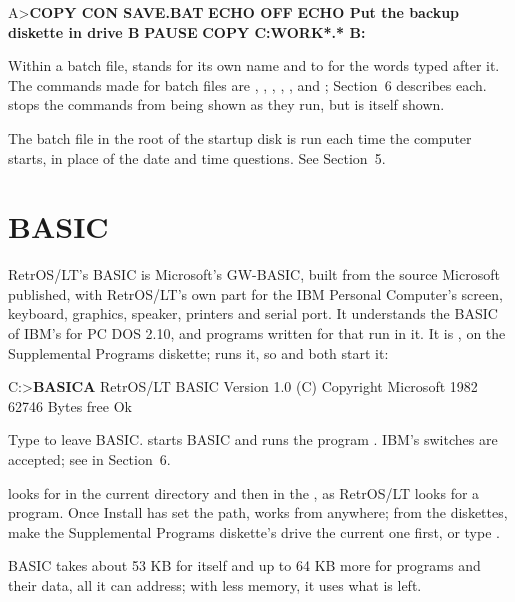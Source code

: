 \begin{dialogue}
A>\textbf{COPY CON SAVE.BAT}
\textbf{ECHO OFF}
\textbf{ECHO Put the backup diskette in drive B}
\textbf{PAUSE}
\textbf{COPY C:\bs{}WORK\bs{}*.* B:}
 
\end{dialogue}

Within a batch file,  stands for its own name and  to
 for the words typed after it. The commands made for batch
files are , , , ,
,  and ; Section~6 describes each.
 stops the commands from being shown as they run, but is
itself shown.

The batch file  in the root of the startup disk is run
each time the computer starts, in place of the date and time questions.
See Section~5.

\section{BASIC}

RetrOS/LT's BASIC is Microsoft's GW-BASIC, built from the source
Microsoft published, with RetrOS/LT's own part for the IBM Personal
Computer's screen, keyboard, graphics, speaker, printers and serial port.
It understands the BASIC of IBM's  for PC DOS 2.10, and
programs written for that run in it. It is , on the
Supplemental Programs diskette;  runs it, so
 and  both start it:

\begin{dialogue}
C:\bs>\textbf{BASICA}
RetrOS/LT BASIC Version 1.0
(C) Copyright Microsoft 1982
62746 Bytes free
Ok
\end{dialogue}

Type  to leave BASIC.  starts BASIC and
runs the program . IBM's switches are accepted; see
 in Section~6.

 looks for  in the current directory and
then in the , as RetrOS/LT looks for a program. Once Install
has set the path,  works from anywhere; from the diskettes,
make the Supplemental Programs diskette's drive the current one first, or
type .

BASIC takes about 53 KB for itself and up to 64 KB more for programs and
their data, all it can address; with less memory, it uses what is left.

